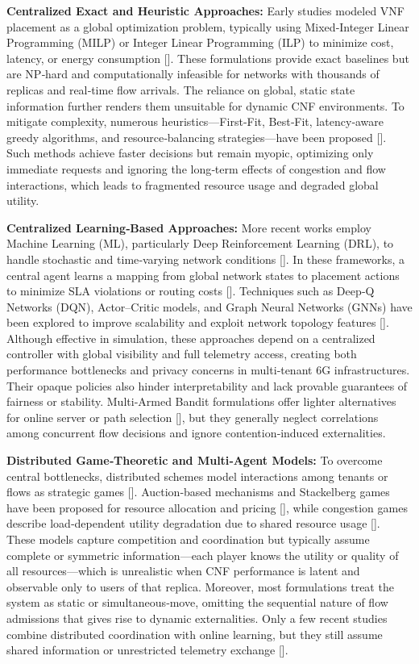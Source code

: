 \documentclass[journal]{IEEEtran}
\theoremstyle{plain}
\theoremstyle{definition}
\theoremstyle{remark}
\begin{document}
\textbf{Centralized Exact and Heuristic Approaches:}
Early studies modeled VNF placement as a global optimization problem, typically using Mixed‑Integer Linear Programming (MILP) or Integer Linear Programming (ILP) to minimize cost, latency, or energy consumption []. These formulations provide exact baselines but are NP‑hard and computationally infeasible for networks with thousands of replicas and real‑time flow arrivals. The reliance on global, static state information further renders them unsuitable for dynamic CNF environments. To mitigate complexity, numerous heuristics—First‑Fit, Best‑Fit, latency‑aware greedy algorithms, and resource‑balancing strategies—have been proposed []. Such methods achieve faster decisions but remain myopic, optimizing only immediate requests and ignoring the long‑term effects of congestion and flow interactions, which leads to fragmented resource usage and degraded global utility.

\textbf{Centralized Learning‑Based Approaches:}
More recent works employ Machine Learning (ML), particularly Deep Reinforcement Learning (DRL), to handle stochastic and time‑varying network conditions []. In these frameworks, a central agent learns a mapping from global network states to placement actions to minimize SLA violations or routing costs []. Techniques such as Deep‑Q Networks (DQN), Actor–Critic models, and Graph Neural Networks (GNNs) have been explored to improve scalability and exploit network topology features []. Although effective in simulation, these approaches depend on a centralized controller with global visibility and full telemetry access, creating both performance bottlenecks and privacy concerns in multi‑tenant 6G infrastructures. Their opaque policies also hinder interpretability and lack provable guarantees of fairness or stability. Multi‑Armed Bandit formulations offer lighter alternatives for online server or path selection [], but they generally neglect correlations among concurrent flow decisions and ignore contention‑induced externalities.

\textbf{Distributed Game‑Theoretic and Multi‑Agent Models:}
To overcome central bottlenecks, distributed schemes model interactions among tenants or flows as strategic games []. Auction‑based mechanisms and Stackelberg games have been proposed for resource allocation and pricing [], while congestion games describe load‑dependent utility degradation due to shared resource usage []. These models capture competition and coordination but typically assume complete or symmetric information—each player knows the utility or quality of all resources—which is unrealistic when CNF performance is latent and observable only to users of that replica. Moreover, most formulations treat the system as static or simultaneous‑move, omitting the sequential nature of flow admissions that gives rise to dynamic externalities. Only a few recent studies combine distributed coordination with online learning, but they still assume shared information or unrestricted telemetry exchange [].  
\end{document}
